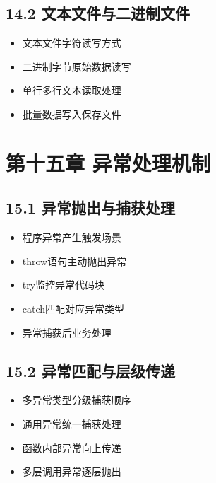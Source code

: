 \subsection{14.2 文本文件与二进制文件}
\begin{itemize}
\item 文本文件字符读写方式
\item 二进制字节原始数据读写
\item 单行多行文本读取处理
\item 批量数据写入保存文件
\end{itemize}

\section{第十五章 异常处理机制}
\subsection{15.1 异常抛出与捕获处理}
\begin{itemize}
\item 程序异常产生触发场景
\item throw语句主动抛出异常
\item try监控异常代码块
\item catch匹配对应异常类型
\item 异常捕获后业务处理
\end{itemize}

\subsection{15.2 异常匹配与层级传递}
\begin{itemize}
\item 多异常类型分级捕获顺序
\item 通用异常统一捕获处理
\item 函数内部异常向上传递
\item 多层调用异常逐层抛出
\end{itemize}
